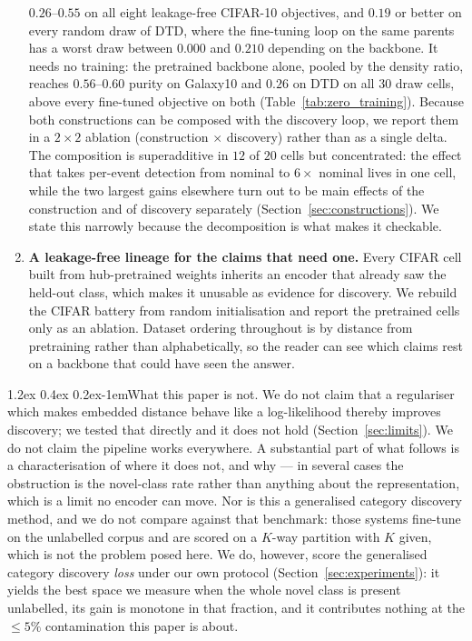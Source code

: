 \documentclass{article}
\makeatletter
\renewcommand\paragraph{\@startsection{paragraph}{4}{\z@}%
  {1.2ex \@plus 0.4ex \@minus 0.2ex}{-1em}{\normalsize\bf}}
\makeatother
\begin{document}
\begin{enumerate}
  $0.26$--$0.55$ on all eight leakage-free CIFAR-10 objectives, and $0.19$ or
  better on every random draw of DTD, where the fine-tuning loop on the same
  parents has a worst draw between $0.000$ and $0.210$ depending on the
  backbone. It needs no training: the pretrained backbone alone, pooled by
  the density ratio, reaches $0.56$--$0.60$ purity on Galaxy10 and $0.26$ on
  DTD on all $30$ draw cells, above every fine-tuned objective on both
  (Table~\ref{tab:zero_training}). Because both constructions can be composed with the discovery
  loop, we report them in a $2\times2$ ablation (construction $\times$
  discovery) rather than as a single delta. The composition is superadditive
  in $12$ of $20$ cells but concentrated: the effect that takes per-event
  detection from nominal to $6\times$ nominal lives in one cell, while the two
  largest gains elsewhere turn out to be main effects of the construction and
  of discovery separately (Section~\ref{sec:constructions}). We state this
  narrowly because the decomposition is what makes it checkable.
\item \textbf{A leakage-free lineage for the claims that need one.} Every
  CIFAR cell built from hub-pretrained weights inherits an encoder that
  already saw the held-out class, which makes it unusable as evidence for
  discovery. We rebuild the CIFAR battery from random initialisation and
  report the pretrained cells only as an ablation. Dataset ordering throughout
  is by distance from pretraining rather than alphabetically, so the reader
  can see which claims rest on a backbone that could have seen the answer.
\end{enumerate}

\paragraph{What this paper is not.}
We do not claim that a regulariser which makes embedded distance behave like a
log-likelihood thereby improves discovery; we tested that directly and it does
not hold (Section~\ref{sec:limits}). We do not claim the pipeline works
everywhere. A substantial part of what follows is a characterisation of where
it does not, and why --- in several cases the obstruction is the novel-class
rate rather than anything about the representation, which is a limit no
encoder can move. Nor is this a generalised category discovery method, and we
do not compare against that benchmark: those systems fine-tune on the
unlabelled corpus and are scored on a $K$-way partition with $K$ given, which
is not the problem posed here. We do, however, score the generalised category
discovery \emph{loss} under our own protocol
(Section~\ref{sec:experiments}): it yields the best space we measure when the
whole novel class is present unlabelled, its gain is monotone in that
fraction, and it contributes nothing at the $\le 5\%$ contamination this
paper is about.
\end{document}
